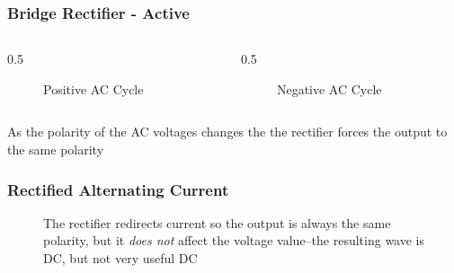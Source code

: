 \begin{frame}
    \frametitle{Bridge Rectifier - Active}

    \begin{columns}
        \begin{column}{0.5\linewidth}
            \begin{figure}
                \centering
                \resizebox{0.9\columnwidth}{!}{
                    
                }

                {\tiny Positive AC Cycle\par}
            \end{figure}
        \end{column}
        \begin{column}{0.5\linewidth}
            \begin{figure}
                \centering
                \resizebox{\columnwidth}{!}{
                    
                }
                
                {\tiny Negative AC Cycle\par}
            \end{figure}
        \end{column}
    \end{columns}

    \vspace{0.5em}
    \centering
    {\footnotesize As the polarity of the AC voltages changes the the rectifier forces the output to the same polarity\par}

\end{frame}

\begin{frame}
    \frametitle{Rectified Alternating Current}

    \begin{figure}
        \centering
        \resizebox{0.75\linewidth}{!}{
            
        }

        {\footnotesize The rectifier redirects current so the output is always the same polarity, but it \emph{does not} affect the voltage value--the resulting wave is DC, but not very useful DC\par}

    \end{figure}

\end{frame}

